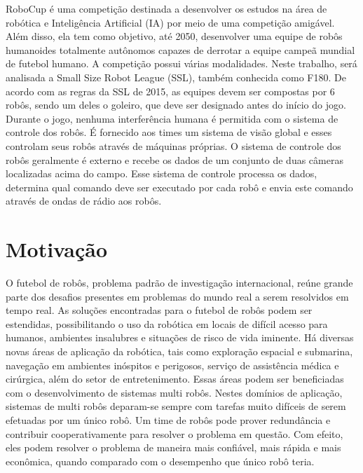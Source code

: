 RoboCup é uma competição destinada a desenvolver os estudos na área de robótica
e Inteligência Artificial (IA) por meio de uma competição amigável. Além disso,
ela tem como objetivo, até 2050, desenvolver uma equipe de robôs humanoides
totalmente autônomos capazes de derrotar a equipe campeã mundial de futebol
humano. A competição possui várias modalidades. Neste trabalho, será analisada a
Small Size Robot League (SSL), também conhecida como F180. De acordo com as
regras da SSL de 2015, as equipes devem ser compostas por 6 robôs, sendo um deles o
goleiro, que deve ser designado antes do início do jogo. Durante o jogo, nenhuma
interferência humana é permitida com o sistema de controle dos robôs. É
fornecido aos times um sistema de visão global e esses controlam seus robôs através de
máquinas próprias. O sistema de controle dos robôs geralmente é externo e recebe
os dados de um conjunto de duas câmeras localizadas acima do campo. Esse sistema
de controle processa os dados, determina qual comando deve ser executado por
cada robô e envia este comando através de ondas de rádio aos robôs.

\section{Motivação}


O futebol de robôs, problema padrão de investigação internacional, reúne grande
parte dos desafios presentes em problemas do mundo real a serem resolvidos em
tempo real. As soluções encontradas para o futebol de robôs podem ser
estendidas, possibilitando o uso da robótica em locais de difícil acesso para
humanos, ambientes insalubres e situações de risco de vida iminente.  Há
diversas novas áreas de aplicação da robótica, tais como exploração espacial e
submarina, navegação em ambientes inóspitos e perigosos, serviço de assistência
médica e cirúrgica, além do setor de entretenimento. Essas áreas podem ser
beneficiadas com o desenvolvimento de sistemas multi robôs. Nestes domínios de
aplicação, sistemas de multi robôs deparam-se sempre com tarefas muito difíceis
de serem efetuadas por um único robô.  Um time de robôs pode prover redundância
e contribuir cooperativamente para resolver o problema em questão. Com efeito,
eles podem resolver o problema de maneira mais confiável, mais rápida e mais
econômica, quando comparado com o desempenho que único robô teria.

